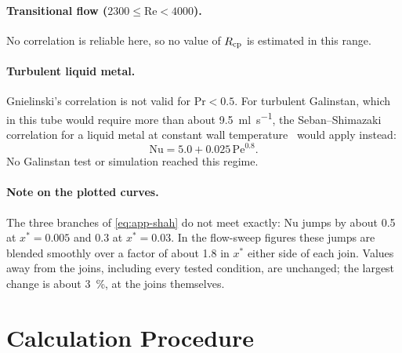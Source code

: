 \paragraph{Transitional flow ($2300 \le \mathrm{Re} < 4000$).} No correlation
is reliable here, so no value of $R_{\mathrm{cp}}$ is estimated in this range.

\paragraph{Turbulent liquid metal.} Gnielinski's correlation is not valid for
$\mathrm{Pr} < 0.5$. For turbulent Galinstan, which in this tube would require
more than about \SI{9.5}{\milli\litre\per\second}, the Seban--Shimazaki
correlation for a liquid metal at constant wall
temperature~\cite{bergman_fundamentals_2017} would apply instead:
\begin{equation}
  \mathrm{Nu} = 5.0 + 0.025\,\mathrm{Pe}^{0.8}.
  \label{eq:app-seban}
\end{equation}
No Galinstan test or simulation reached this regime.

\paragraph{Note on the plotted curves.} The three branches of
\cref{eq:app-shah} do not meet exactly: Nu jumps by about 0.5 at $x^* = 0.005$
and 0.3 at $x^* = 0.03$. In the flow-sweep figures these jumps are blended
smoothly over a factor of about 1.8 in $x^*$ either side of each join. Values
away from the joins, including every tested condition, are unchanged; the
largest change is about \SI{3}{\percent}, at the joins themselves.

\section{Calculation Procedure}


